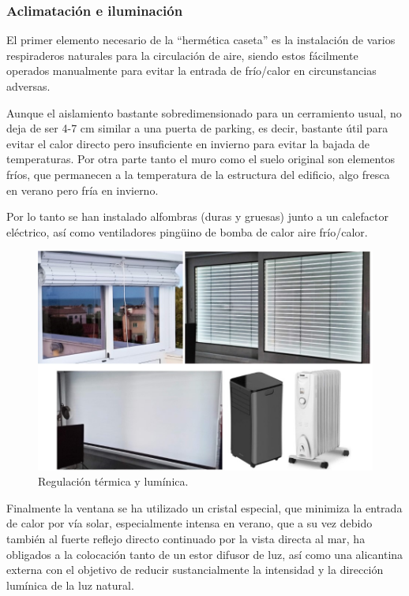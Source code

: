 \newpage
\subsubsection{Aclimatación e iluminación}\label{S:iluminacion_caseta}
El primer elemento necesario de la “hermética caseta” es la instalación de varios respiraderos naturales para la circulación de aire, siendo estos fácilmente operados manualmente para evitar la entrada de frío/calor en circunstancias adversas.

 Aunque el aislamiento bastante sobredimensionado para un cerramiento usual, no deja de ser 4-7 cm similar a una puerta de parking, es decir, bastante útil para evitar el calor directo pero insuficiente en invierno para evitar la bajada de temperaturas. Por otra parte tanto el muro como el suelo original son elementos fríos, que permanecen a la temperatura de la estructura del edificio, algo fresca en verano pero fría en invierno.

 Por lo tanto se han instalado alfombras (duras y gruesas) junto a un calefactor eléctrico, así como ventiladores pingüino de bomba de calor aire frío/calor.

 \begin{figure}[!htb]
\begin{center}
\includegraphics[width=1\textwidth]{./figuras/luz_regulacion_termica.jpg}
\caption{Regulación térmica y lumínica.}
\label{F:luz_regulacion_termica}
\end{center}
\end{figure}

Finalmente la ventana se ha utilizado un cristal especial, que minimiza la entrada de calor por vía solar, especialmente intensa en verano, que a su vez debido también al fuerte reflejo directo continuado por la vista directa al mar, ha obligados a la colocación tanto de un estor difusor de luz, así como una alicantina externa con el objetivo de reducir sustancialmente la intensidad y la dirección lumínica de la luz natural.

